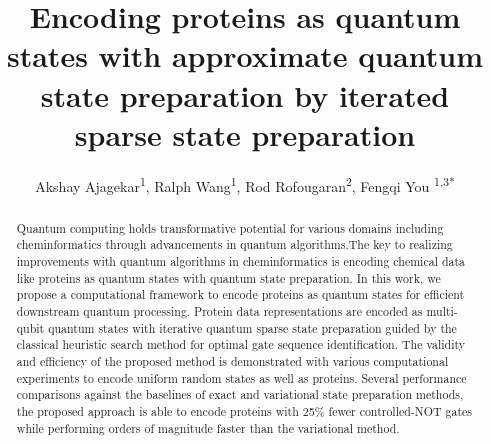\documentclass[12pt]{iopart}
\begin{document}
\setcounter{equation}{0}

\title[]{Encoding proteins as quantum states with approximate quantum state
preparation by iterated sparse state preparation}

\author{Akshay Ajagekar\textsuperscript{1}, Ralph Wang\textsuperscript{1}, Rod Rofougaran\textsuperscript{2}, Fengqi You \textsuperscript{1,3*}}

\address{\textsuperscript{1}Systems Engineering, Cornell University, Ithaca, NY, USA}
\address{\textsuperscript{2}School of Applied and Engineering Physics, Cornell University, Ithaca, NY, USA}
\address{\textsuperscript{3}Robert Frederick Smith School of Chemical and Biomolecular Engineering, Cornell University, Ithaca, NY, USA}



\begin{abstract}
Quantum computing holds transformative potential for various domains including cheminformatics through advancements in quantum algorithms.The key to realizing improvements with quantum algorithms in cheminformatics is encoding chemical data like proteins as quantum states with quantum state preparation. In this work, we propose a computational framework to encode proteins as quantum states for efficient downstream quantum processing. Protein data representations are encoded as multi-qubit quantum states with iterative quantum sparse state preparation guided by the classical heuristic search method for optimal gate sequence identification. The validity and efficiency of the proposed method is demonstrated with various computational experiments to encode uniform random states as well as proteins. Several performance comparisons against the baselines of exact and variational state preparation methods, the proposed approach is able to encode proteins with 25\% fewer controlled-NOT gates while performing orders of magnitude faster than the variational method.  
\end{abstract}

%
%
%
% 
%
\end{document}
